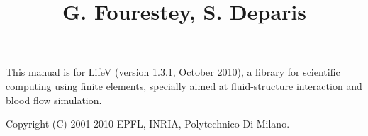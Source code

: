 \documentclass[a4paper, 12pt, report]{lifestyle}
\title{\lifetitle{LifeV User Manual}
{G. Fourestey, S. Deparis}
}
\date{}
\begin{document}
\maketitle

\phantom{dummy text}
\vfill
This manual is for LifeV (version 1.3.1, October 2010), a library for scientific computing 
using finite elements, specially aimed at fluid-structure interaction and blood flow simulation.

Copyright (C) 2001-2010 EPFL, INRIA, Polytechnico Di Milano.

\tableofcontents


\listoftables







\printindex
\end{document}
